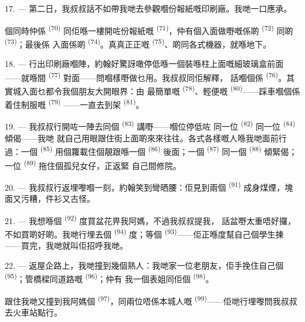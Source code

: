 \VUsaut{3.0mm}

17. --- 第二日，我叔叔話不如帶我哋去參觀嗰份報紙嘅印刷廠。我哋一口應承。

個同時仲係 \textsuperscript{(70)}
同佢喺一樓開咗份報紙嘅
 \textsuperscript{(71)}，仲有個入面做嘢嘅係啲
 \textsuperscript{(72)} 同啲 \textsuperscript{(73)}；最後係
入面係啲 \textsuperscript{(74)}。真真正正嘅
\textsuperscript{(75)}、啲同各式機器，就喺地下。

\VUsaut{3.0mm}

18. --- 行出印刷廠嗰陣，約翰好驚訝噉停低喺一個裝喺柱上面嘅細玻璃盒前面
——就喺間 \textsuperscript{(77)} 對面——問嗰樣嘢做乜用。我叔叔同佢解釋，
話嗰個係 \textsuperscript{(76)}。其實城入面乜都令我個朋友大開眼界：由
最簡單嘅 \textsuperscript{(78)}、輕便嘅
\textsuperscript{(80)}——踩車嗰個係着住制服嘅 \textsuperscript{(79)}
——一直去到架 \textsuperscript{(81)}。

19. --- 我叔叔行開咗一陣去同個 \textsuperscript{(83)} 講嘢——嗰位停低咗
同一位 \textsuperscript{(82)} 同一位 \textsuperscript{(84)} 傾偈——我哋
就自己用眼跟住街上面啲來來往往。各式各樣嘅人喺我哋面前行過：一個
 \textsuperscript{(85)} 用個籮載住個靚跟喺一個
\textsuperscript{(86)} 後面；一個 \textsuperscript{(87)} 同一個
\textsuperscript{(88)} 傾緊偈；一位 \textsuperscript{(89)} 拖住個孤兒女仔，正返緊
自己間修院。

\VUsaut{3.0mm}

20. --- 我叔叔行返埋嚟嗰一刻，約翰笑到彎晒腰：佢見到兩個
\textsuperscript{(91)} 成身煤煙，塊面又污糟，件衫又古怪。

21. --- 我想喺個 \textsuperscript{(92)} 度買盆花畀我阿媽，不過我叔叔提我，
話盆嘢太重唔好攞，不如買啲好啲。我哋行埋去個
\textsuperscript{(94)} 度；等個 \textsuperscript{(93)}——佢正喺度幫自己個學生揀
——買完，我哋就叫佢招呼我哋。

22. --- 返屋企路上，我哋撞到幾個熟人：我哋家一位老朋友，佢手挽住自己個
 \textsuperscript{(95)}；管橋樑同道路嘅 \textsuperscript{(96)}；仲有
我一個表姐同佢個 \textsuperscript{(98)}。

跟住我哋又撞到我阿媽個 \textsuperscript{(97)}，同兩位唔係本城人嘅
 \textsuperscript{(99)}——佢哋行埋嚟問我叔叔去火車站點行。

\VUsaut{6.0mm}
\VUfilet{22mm}
